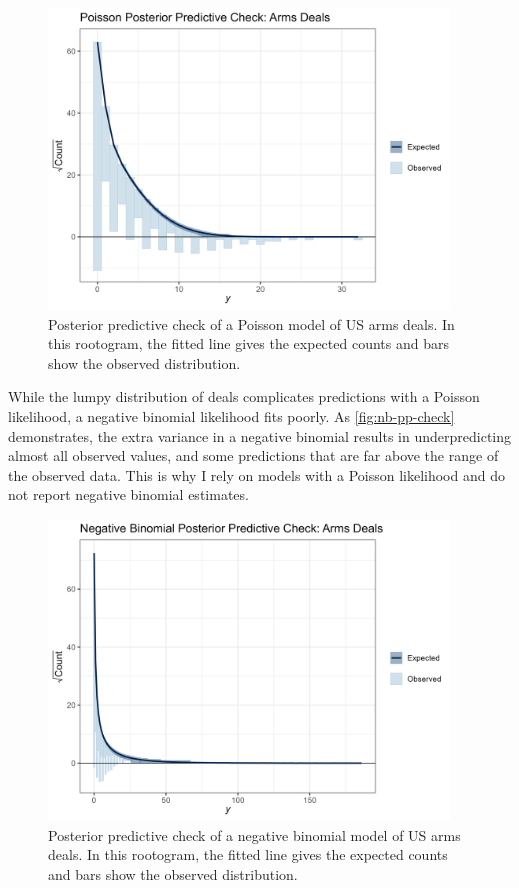 \documentclass[12pt]{article}
\begin{document}
\begin{figure}[htpb]
	\centering
		\includegraphics[width=0.95\textwidth]{pois-pp-check.png}
	\caption{Posterior predictive check of a Poisson model of US arms deals. In this rootogram, the fitted line gives the expected counts and bars show the observed distribution.}
	\label{fig:pois-pp-check}
\end{figure}


While the lumpy distribution of deals complicates predictions with a Poisson likelihood, a negative binomial likelihood fits poorly. 
As \autoref{fig:nb-pp-check} demonstrates, the extra variance in a negative binomial results in underpredicting almost all observed values, and some predictions that are far above the range of the observed data. 
This is why I rely on models with a Poisson likelihood and do not report negative binomial estimates. 


\begin{figure}[htpb]
	\centering
		\includegraphics[width=0.95\textwidth]{nb-pp-check.png}
	\caption{Posterior predictive check of a negative binomial model of US arms deals. In this rootogram, the fitted line gives the expected counts and bars show the observed distribution.}
	\label{fig:nb-pp-check}
\end{figure}
\end{document}
